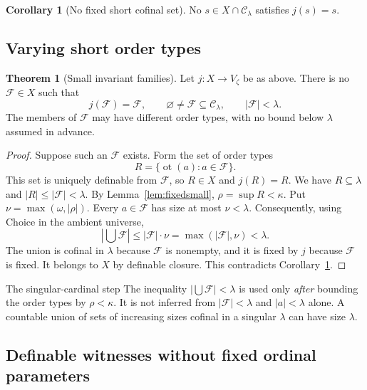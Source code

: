 \documentclass[11pt,letterpaper]{article}
\theoremstyle{definition}
\newtheorem{theorem}[definition]{Theorem}
\newtheorem{corollary}[definition]{Corollary}
\numberwithin{equation}{section}
\newcommand{\ot}{\operatorname{ot}}
\newcommand{\C}{\mathcal C_\lambda}
\newcommand{\FF}{\mathcal F}
\begin{document}
\begin{corollary}[No fixed short cofinal set]\label{cor:noshort}
No $s\in X\cap\C$ satisfies $j(s)=s$.
\end{corollary}

\subsection{Varying short order types}

\begin{theorem}[Small invariant families]\label{thm:localfamily}
Let $j:X\to V_\zeta$ be as above. There is no $\FF\in X$ such that
\[
 j(\FF)=\FF,\qquad
 \varnothing\ne\FF\subseteq\C,\qquad |\FF|<\lambda.
\]
The members of $\FF$ may have different order types, with no bound below $\lambda$ assumed in advance.
\end{theorem}
\begin{proof}
Suppose such an $\FF$ exists. Form the set of order types
\[
 R=\{\ot(a):a\in\FF\}.
\]
This set is uniquely definable from $\FF$, so $R\in X$ and $j(R)=R$. We have $R\subseteq\lambda$ and $|R|\le|\FF|<\lambda$. By Lemma~\ref{lem:fixedsmall}, $\rho=\sup R<\kappa$. Put $\nu=\max(\omega,|\rho|)$. Every $a\in\FF$ has size at most $\nu<\lambda$. Consequently, using Choice in the ambient universe,
\[
 \left|\bigcup\FF\right|
 \le |\FF|\cdot\nu
 =\max(|\FF|,\nu)<\lambda.
\]
The union is cofinal in $\lambda$ because $\FF$ is nonempty, and it is fixed by $j$ because $\FF$ is fixed. It belongs to $X$ by definable closure. This contradicts Corollary~\ref{cor:noshort}.
\end{proof}

\begin{assessment}{The singular-cardinal step}
The inequality $|\bigcup\FF|<\lambda$ is used only \emph{after} bounding the order types by $\rho<\kappa$. It is not inferred from $|\FF|<\lambda$ and $|a|<\lambda$ alone. A countable union of sets of increasing sizes cofinal in a singular $\lambda$ can have size $\lambda$.
\end{assessment}

\subsection{Definable witnesses without fixed ordinal parameters}
\end{document}
